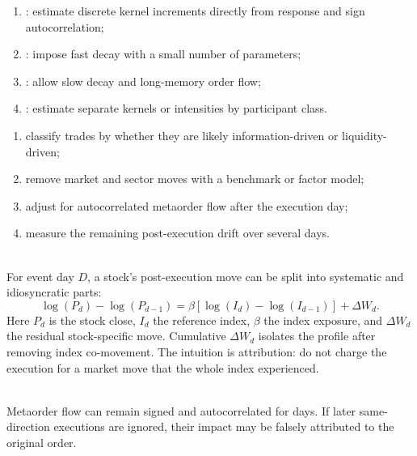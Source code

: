 \documentclass[a4paper,oneside,openany]{book}
\begin{document}
\begin{taxonomy} 
\begin{enumerate}[label=\roman*.]
\setlength{\itemsep}{0pt}
\item {}: estimate discrete kernel increments directly from response and sign autocorrelation;
\item {}: impose fast decay with a small number of parameters;
\item {}: allow slow decay and long-memory order flow;
\item {}: estimate separate kernels or intensities by participant class.
\end{enumerate}
\end{taxonomy}

\begin{process} 
\begin{enumerate}[label=\roman*.]
\setlength{\itemsep}{0pt}
\item classify trades by whether they are likely information-driven or liquidity-driven;
\item remove market and sector moves with a benchmark or factor model;
\item adjust for autocorrelated metaorder flow after the execution day;
\item measure the remaining post-execution drift over several days.
\end{enumerate}
\end{process}

\begin{model} \\
For event day $D$, a stock's post-execution move can be split into systematic and idiosyncratic parts:
\begin{equation*}
\log(P_d)-\log(P_{d-1})=
\beta\left[\log(I_d)-\log(I_{d-1})\right]+\Delta W_d.
\end{equation*}
Here $P_d$ is the stock close, $I_d$ the reference index, $\beta$ the index exposure, and $\Delta W_d$ the residual stock-specific move. Cumulative $\Delta W_d$ isolates the profile after removing index co-movement. The intuition is attribution: do not charge the execution for a market move that the whole index experienced.
\end{model}

\begin{caveat} \\
Metaorder flow can remain signed and autocorrelated for days. If later same-direction executions are ignored, their impact may be falsely attributed to the original order.
\end{caveat}
\end{document}
